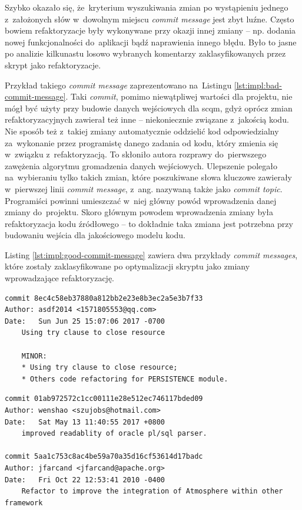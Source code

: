 \documentclass[twoside]{praca}
\begin{document}
Szybko okazało się, że~kryterium wyszukiwania zmian po wystąpieniu jednego z~założonych słów w~dowolnym miejscu \textit{commit message} jest zbyt luźne. Często bowiem refaktoryzacje były wykonywane przy okazji innej zmiany -- np. dodania nowej funkcjonalności do~aplikacji bądź naprawienia innego błędu. Było to jasne po analizie kilkunastu losowo wybranych komentarzy zaklasyfikowanych przez skrypt jako refaktoryzacje. 

Przykład takiego \textit{commit message} zaprezentowano na~Listingu \ref{lst:impl:bad-commit-message}. Taki \textit{commit}, pomimo niewątpliwej wartości dla projektu, nie mógł być użyty przy budowie danych wejściowych dla \gls{scqm}, gdyż oprócz zmian refaktoryzacyjnych zawierał też inne -- niekoniecznie związane z~jakością kodu. Nie sposób też z~takiej zmiany automatycznie oddzielić kod odpowiedzialny za~wykonanie przez programistę danego zadania od kodu, który zmienia się w~związku z~refaktoryzacją. To skłoniło autora rozprawy do~pierwszego zawężenia algorytmu gromadzenia danych wejściowych. Ulepszenie polegało na~wybieraniu tylko takich zmian, które poszukiwane słowa kluczowe zawierały w~pierwszej linii \textit{commit message}, z~ang. nazywaną także jako \textit{commit topic}. Programiści powinni umieszczać w~niej główny powód wprowadzenia danej zmiany do~projektu. Skoro głównym powodem wprowadzenia zmiany była refaktoryzacja kodu źródłowego -- to dokładnie taka zmiana jest potrzebna przy budowaniu wejścia dla jakościowego modelu kodu.

Listing \ref{lst:impl:good-commit-message} zawiera dwa przykłady \textit{commit messages}, które zostały zaklasyfikowane po optymalizacji skryptu jako zmiany wprowadzające refaktoryzację.

\begin{lstlisting}[frame=single,caption={Przykład komentarza do~zmiany, który został niepoprawnie sklasyfikowany jako refaktoryzacja kodu},captionpos=b,label={lst:impl:bad-commit-message}]
commit 8ec4c58eb37880a812bb2e23e8b3ec2a5e3b7f33
Author: asdf2014 <1571805553@qq.com>
Date:   Sun Jun 25 15:07:06 2017 -0700
    Using try clause to close resource

    MINOR:
    * Using try clause to close resource;
    * Others code refactoring for PERSISTENCE module.
\end{lstlisting}

\begin{lstlisting}[frame=single,caption={Przykład komentarzy do~zmian, które zostały sklasyfikowane jako refaktoryzacje kodu (po optymalizacji)},captionpos=b,label={lst:impl:good-commit-message}]
commit 01ab972572c1cc00111e28e512ec746117bded09
Author: wenshao <szujobs@hotmail.com>
Date:   Sat May 13 11:40:55 2017 +0800
    improved readablity of oracle pl/sql parser.

commit 5aa1c753c8ac4be59a70a35d16cf53614d17badc
Author: jfarcand <jfarcand@apache.org>
Date:   Fri Oct 22 12:53:41 2010 -0400
    Refactor to improve the integration of Atmosphere within other framework
\end{lstlisting}
\end{document}

